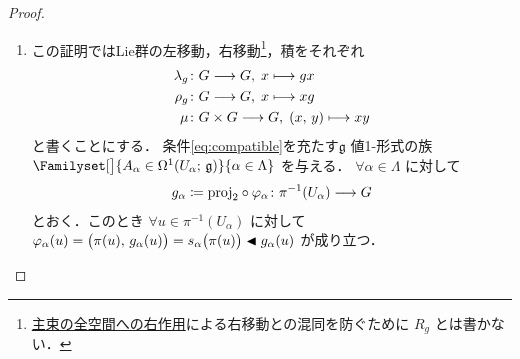 \documentclass[geometry_main]{subfiles}
\begin{document}
\begin{proof}
    \begin{enumerate}
        \item 
        この証明ではLie群の左移動，右移動\footnote{\hyperref[prop.PFD_right]{主束の全空間への右作用}による右移動との混同を防ぐために $R_g$ とは書かない．}，積をそれぞれ
        \begin{align}
            \lambda_g &\colon G \longrightarrow G,\; x \longmapsto gx \\
            \rho_g &\colon G \longrightarrow G,\; x \longmapsto xg \\
            \mu &\colon G \times G \longrightarrow G,\; (x,\, y) \longmapsto xy
        \end{align}
        と書くことにする．
        条件\eqref{eq:compatible}を充たす$\mathfrak{g}$ 値1-形式の族 $\Familyset[\big]{A_\alpha \in \Omega^1(U_\alpha;\, \mathfrak{g})}{\alpha \in \Lambda}$ を与える．
        $\forall \alpha \in \Lambda$ に対して
        \begin{align}
            g_\alpha \coloneqq \mathrm{proj}_2 \circ \varphi_\alpha \colon \pi^{-1}(U_\alpha) \longrightarrow G
        \end{align}
        とおく．このとき $\forall u \in \pi^{-1}(U_\alpha)$ に対して $\varphi_\alpha(u) = \bigl( \pi(u),\, g_\alpha(u)\bigr) = s_\alpha \bigl(\pi(u)\bigr) \blacktriangleleft g_\alpha(u)$ が成り立つ．
        

\end{enumerate}
\end{proof}
\end{document}
